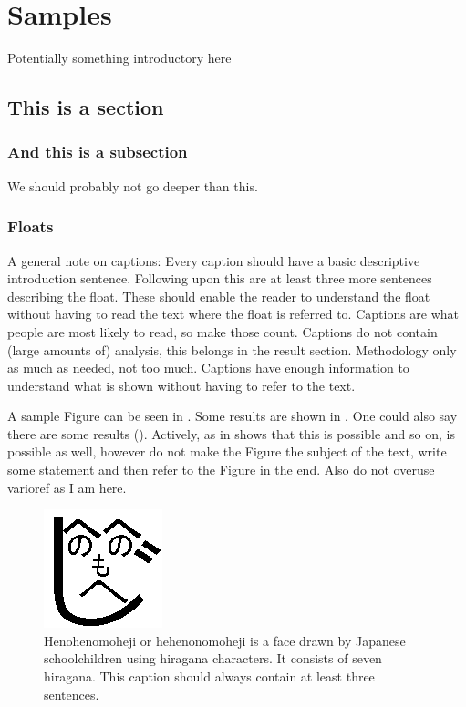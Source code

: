 \chapter{Samples}
\label{cp:samples}
Potentially something introductory here
\section{This is a section}
\label{sec:samplesec}
\subsection{And this is a subsection}
\label{sec:asubsec}
We should probably not go deeper than this.
\subsection{Floats}
\label{sec:floats}
A general note on captions: Every caption should have a basic descriptive introduction sentence. Following upon this are at least three more sentences describing the float.
These should enable the reader to understand the float without having to read the text where the float is referred to. Captions are what people are most likely to read, so make those count.
Captions do not contain (large amounts of) analysis, this belongs in the result section. Methodology only as much as needed, not too much. Captions have enough information to understand
what is shown without having to refer to the text.

A sample Figure can be seen in . Some results are shown in . One could also say there are some results (). Actively, as in
 shows that this is possible and so on, is possible as well, however do not make the Figure the subject of the text, write some statement and then refer to the Figure in the end. Also do not overuse varioref as I am here.
\begin{figure}[t]
 \centering
 \includegraphics[]{Henohenomoheji.png} %
 \caption[]{ Henohenomoheji or hehenonomoheji is a face drawn by Japanese schoolchildren 
 using hiragana characters. It consists of seven hiragana. This caption should always contain at least three sentences.}
 \label{fig:samplefig}
\end{figure}

